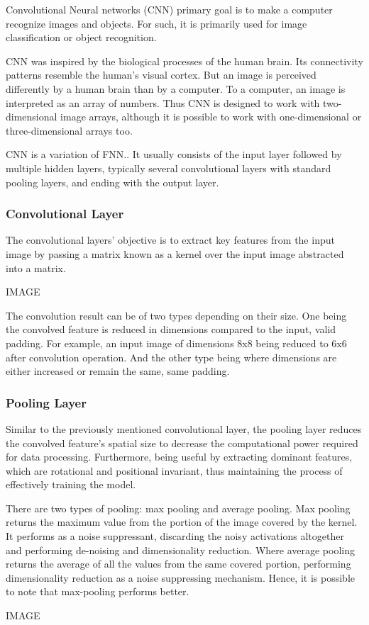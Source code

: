 Convolutional Neural networks (CNN) primary goal is to make a computer recognize images and objects. For such, it is primarily used for image classification or object recognition.

CNN was inspired by the biological processes of the human brain. Its connectivity patterns resemble the human's visual cortex. But an image is perceived differently by a human brain than by a computer. To a computer, an image is interpreted as an array of numbers. Thus CNN is designed to work with two-dimensional image arrays, although it is possible to work with one-dimensional or three-dimensional arrays too.\cite{mlmastery}

CNN is a variation of FNN.\cite{Goodfellow-et-al-2016}. It usually consists of the input layer followed by multiple hidden layers, typically several convolutional layers with standard pooling layers, and ending with the output layer. 

\subsubsection{Convolutional Layer}

The convolutional layers' objective is to extract key features from the input image by passing a matrix known as a kernel over the input image abstracted into a matrix.\cite{mathworkscnn}

IMAGE

The convolution result can be of two types depending on their size. One being the convolved feature is reduced in dimensions compared to the input, valid padding. For example, an input image of dimensions 8x8 being reduced to 6x6 after convolution operation. And the other type being where dimensions are either increased or remain the same, same padding. \cite{compguideCnn}

\subsubsection{Pooling Layer}


Similar to the previously mentioned convolutional layer, the pooling layer reduces the convolved feature's spatial size to decrease the computational power required for data processing. Furthermore, being useful by extracting dominant features, which are rotational and positional invariant, thus maintaining the process of effectively training the model.\cite{compguideCnn}

There are two types of pooling: max pooling and average pooling. Max pooling returns the maximum value from the portion of the image covered by the kernel. It performs as a noise suppressant, discarding the noisy activations altogether and performing de-noising and dimensionality reduction. Where average pooling returns the average of all the values from the same covered portion, performing dimensionality reduction as a noise suppressing mechanism. Hence, it is possible to note that max-pooling performs better.\cite{compguideCnn}

IMAGE
